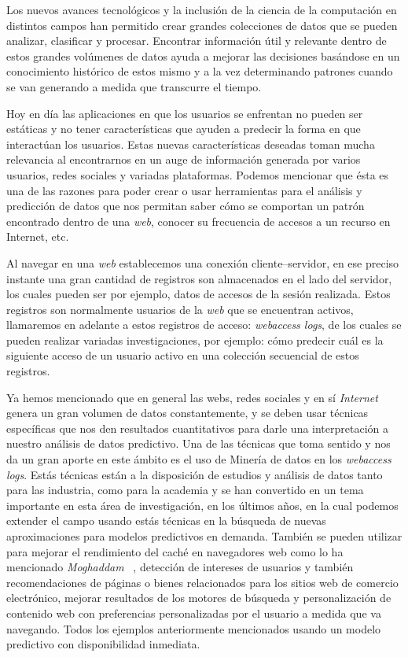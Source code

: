 {
Los nuevos avances tecnológicos y la inclusión de la ciencia de la computación en distintos campos han permitido crear grandes colecciones de datos que se pueden analizar, clasificar y procesar. Encontrar información útil y relevante dentro de estos grandes volúmenes de datos ayuda a mejorar las decisiones basándose en un conocimiento histórico de estos mismo y a la vez determinando patrones cuando se van generando a medida que transcurre el tiempo. 


Hoy en día las aplicaciones en que los usuarios se enfrentan no pueden ser estáticas y no tener características que ayuden a predecir la forma en que interactúan los usuarios. Estas nuevas características deseadas toman mucha relevancia al encontrarnos en un auge de información generada por varios usuarios, redes sociales y variadas plataformas. Podemos mencionar que ésta es una de las razones para poder  crear o usar  herramientas para el análisis y predicción de datos que nos permitan saber cómo se comportan un patrón encontrado dentro de una \emph{web}, conocer su frecuencia de accesos a un recurso en Internet, etc.

Al navegar en una \emph{web} establecemos una conexión {cliente--servidor}, en ese preciso instante una gran cantidad de registros son almacenados en el lado del servidor, los cuales pueden ser por ejemplo, datos de accesos de la sesión realizada. Estos registros  son normalmente usuarios de la \emph{web}  que se encuentran activos, llamaremos en adelante a estos registros de acceso: \emph{webaccess logs},  de los cuales se pueden realizar variadas investigaciones, por ejemplo:  cómo predecir cuál es la siguiente acceso de un usuario activo en una colección secuencial de estos registros. 

Ya hemos mencionado  que  en general las webs, redes sociales y en sí \emph{Internet} genera un gran volumen de datos constantemente, y se deben usar técnicas específicas que nos den resultados cuantitativos para darle una interpretación a nuestro análisis de datos predictivo. Una de las técnicas que toma sentido y nos da un gran aporte en este ámbito es el uso de Minería de datos  en los \emph{webaccess logs}.  Estás técnicas están a la disposición  de estudios y análisis de datos tanto para las industria, como para la academia y  se han convertido en un tema importante en esta área  de investigación, en los últimos años, en la cual podemos extender el campo usando estás técnicas en la búsqueda de nuevas aproximaciones para modelos predictivos en demanda. También se pueden utilizar para mejorar el rendimiento del caché en navegadores web como lo ha mencionado \emph{Moghaddam} \etal~\cite{Moghaddam2009},  detección de intereses de usuarios y también recomendaciones de páginas o bienes relacionados para los sitios {web} de comercio electrónico, mejorar  resultados de los motores de búsqueda y personalización de contenido web con preferencias personalizadas por el usuario a medida que va navegando. Todos los ejemplos anteriormente mencionados usando un modelo predictivo con disponibilidad inmediata.



}

